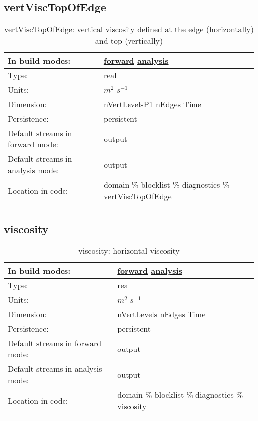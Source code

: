 \subsection[vertViscTopOfEdge]{vertViscTopOfEdge}
\label{subsec:var_sec_diagnostics_vertViscTopOfEdge}
\begin{center}
\begin{longtable}{| p{2.0in} | p{4.0in} |}
        \hline 
        In build modes: & \hyperref[subsec:forward_var_tab_diagnostics]{forward} \hyperref[subsec:analysis_var_tab_diagnostics]{analysis} \\
        \hline 
        Type: & real \\
        \hline 
        Units: & $m^2$ $s^{-1}$ \\
        \hline 
        Dimension: & nVertLevelsP1 nEdges Time \\
        \hline 
        Persistence: & persistent \\
        \hline 
		 Default streams in forward mode: &  output \\
        \hline 
		 Default streams in analysis mode: &  output \\
        \hline 
		 Location in code: & domain \% blocklist \% diagnostics \% vertViscTopOfEdge \\
		 \hline 
    \caption{vertViscTopOfEdge: vertical viscosity defined at the edge (horizontally) and top (vertically)}
\end{longtable}
\end{center}
\subsection[viscosity]{viscosity}
\label{subsec:var_sec_diagnostics_viscosity}
\begin{center}
\begin{longtable}{| p{2.0in} | p{4.0in} |}
        \hline 
        In build modes: & \hyperref[subsec:forward_var_tab_diagnostics]{forward} \hyperref[subsec:analysis_var_tab_diagnostics]{analysis} \\
        \hline 
        Type: & real \\
        \hline 
        Units: & $m^2$ $s^{-1}$ \\
        \hline 
        Dimension: & nVertLevels nEdges Time \\
        \hline 
        Persistence: & persistent \\
        \hline 
		 Default streams in forward mode: &  output \\
        \hline 
		 Default streams in analysis mode: &  output \\
        \hline 
		 Location in code: & domain \% blocklist \% diagnostics \% viscosity \\
		 \hline 
    \caption{viscosity: horizontal viscosity}
\end{longtable}
\end{center}
